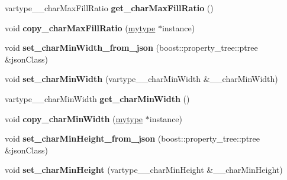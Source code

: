 \begin{DoxyCompactItemize}
\mbox{\label{classfilter_1_1algos_1_1_i_d_plate_rectifier_ae26390d97efffa0a1f86de95998193f6}} 
vartype\+\_\+\+\_\+char\+Max\+Fill\+Ratio {\bfseries get\+\_\+char\+Max\+Fill\+Ratio} ()
\item 
\mbox{\label{classfilter_1_1algos_1_1_i_d_plate_rectifier_ae73f5b1a9884fc4c4da92b8bf02eb687}} 
void {\bfseries copy\+\_\+char\+Max\+Fill\+Ratio} (\hyperlink{classfilter_1_1algos_1_1_i_d_plate_rectifier}{mytype} $\ast$instance)
\item 
\mbox{\label{classfilter_1_1algos_1_1_i_d_plate_rectifier_a2dee84a97795572ccf3e4eb35387e63e}} 
void {\bfseries set\+\_\+char\+Min\+Width\+\_\+from\+\_\+json} (boost\+::property\+\_\+tree\+::ptree \&json\+Class)
\item 
\mbox{\label{classfilter_1_1algos_1_1_i_d_plate_rectifier_ae9873b1b52d95fe8a315d8f02c9e613e}} 
void {\bfseries set\+\_\+char\+Min\+Width} (vartype\+\_\+\+\_\+char\+Min\+Width \&\+\_\+\+\_\+char\+Min\+Width)
\item 
\mbox{\label{classfilter_1_1algos_1_1_i_d_plate_rectifier_a0b60b63876b7a7fa19150ca80a639899}} 
vartype\+\_\+\+\_\+char\+Min\+Width {\bfseries get\+\_\+char\+Min\+Width} ()
\item 
\mbox{\label{classfilter_1_1algos_1_1_i_d_plate_rectifier_a45f30581a973d0373319ff0d9bb6d31c}} 
void {\bfseries copy\+\_\+char\+Min\+Width} (\hyperlink{classfilter_1_1algos_1_1_i_d_plate_rectifier}{mytype} $\ast$instance)
\item 
\mbox{\label{classfilter_1_1algos_1_1_i_d_plate_rectifier_a77aa2156504d42e5a63862d9a266e8a2}} 
void {\bfseries set\+\_\+char\+Min\+Height\+\_\+from\+\_\+json} (boost\+::property\+\_\+tree\+::ptree \&json\+Class)
\item 
\mbox{\label{classfilter_1_1algos_1_1_i_d_plate_rectifier_a1f15e39e4a733507f4a4df43c4b4bf97}} 
void {\bfseries set\+\_\+char\+Min\+Height} (vartype\+\_\+\+\_\+char\+Min\+Height \&\+\_\+\+\_\+char\+Min\+Height)

\end{DoxyCompactItemize}
